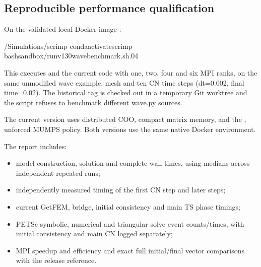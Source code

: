 \documentclass[letterpaper,10pt,english]{sphinxmanual}
\begin{document}
\subsection{Reproducible performance qualification}
\label{\detokenize{performance:reproducible-performance-qualification}}
\sphinxAtStartPar
On the validated local Docker image :

\begin{sphinxVerbatim}[commandchars=\\\{\}]
\PYGZti{}/Simulations/scrimp
condaactivatescrimp
bashsandbox/run\PYGZus{}v130\PYGZus{}wave\PYGZus{}benchmark.sh.04
\end{sphinxVerbatim}

\sphinxAtStartPar
This executes  and the current code
with one, two, four and six MPI ranks, on the same unmodified wave
example, mesh and ten CN time steps (dt=0.002, final time=0.02).
The historical tag is checked out in a temporary Git worktree and
the script refuses to benchmark different wave.py sources.

\sphinxAtStartPar
The current version uses distributed COO, compact matrix memory, and
the , unforced MUMPS policy. Both versions use the same
native Docker environment.

\sphinxAtStartPar
The report includes:
\begin{itemize}
\item {} 
\sphinxAtStartPar
model construction, solution and complete wall times, using medians
across independent repeated runs;

\item {} 
\sphinxAtStartPar
independently measured timing of the first CN step and later steps;

\item {} 
\sphinxAtStartPar
current GetFEM, bridge, initial consistency and main TS phase timings;

\item {} 
\sphinxAtStartPar
PETSc symbolic, numerical and triangular solve event counts/times,
with initial consistency and main CN logged separately;

\item {} 
\sphinxAtStartPar
MPI speedup and efficiency and exact full initial/final vector
comparisons with the release reference.

\end{itemize}
\end{document}
